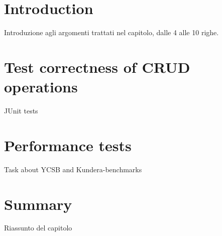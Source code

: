\section{Introduction}
Introduzione agli argomenti trattati nel capitolo, dalle 4 alle 10 righe.

\section{Test correctness of CRUD operations}
JUnit tests

\section{Performance tests}
Task about YCSB and Kundera-benchmarks
 
\section{Summary}
Riassunto del capitolo